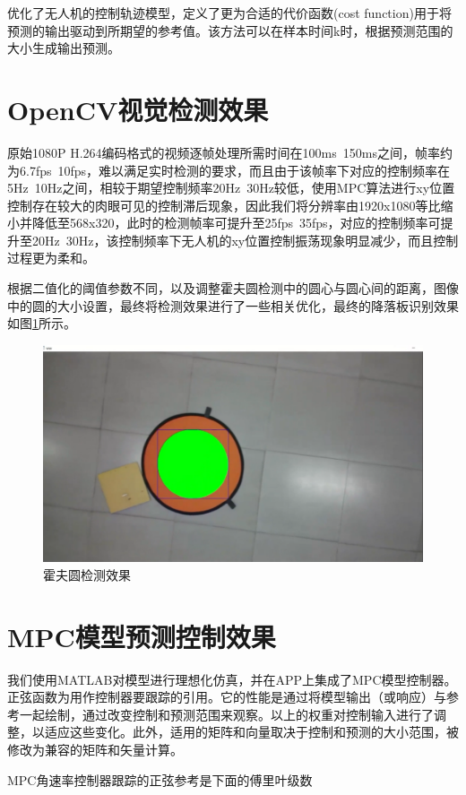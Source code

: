 优化了无人机的控制轨迹模型，定义了更为合适的代价函数(cost function)用于将预测的输出驱动到所期望的参考值。该方法可以在样本时间k时，根据预测范围的大小生成输出预测。

\section{OpenCV视觉检测效果}

原始1080P H.264编码格式的视频逐帧处理所需时间在100ms~150ms之间，帧率约为6.7fps~10fps，难以满足实时检测的要求，而且由于该帧率下对应的控制频率在5Hz~10Hz之间，相较于期望控制频率20Hz~30Hz较低，使用MPC算法进行xy位置控制存在较大的肉眼可见的控制滞后现象，因此我们将分辨率由1920x1080等比缩小并降低至568x320，此时的检测帧率可提升至25fps~35fps，对应的控制频率可提升至20Hz~30Hz，该控制频率下无人机的xy位置控制振荡现象明显减少，而且控制过程更为柔和。

根据二值化的阈值参数不同，以及调整霍夫圆检测中的圆心与圆心间的距离，图像中的圆的大小设置，最终将检测效果进行了一些相关优化，最终的降落板识别效果如图\ref{Fig:img16}所示。

\begin{figure}[ht]
  \centering
  \includegraphics[width=0.8\linewidth]{./Figure/Hough_Circle_Detection.png}
  \caption{霍夫圆检测效果}\label{Fig:img16}
\end{figure}

\section{MPC模型预测控制效果}

我们使用MATLAB对模型进行理想化仿真，并在APP上集成了MPC模型控制器。正弦函数为用作控制器要跟踪的引用。它的性能是通过将模型输出（或响应）与参考一起绘制，通过改变控制和预测范围来观察。以上的权重对控制输入进行了调整，以适应这些变化。此外，适用的矩阵和向量取决于控制和预测的大小范围，被修改为兼容的矩阵和矢量计算。

MPC角速率控制器跟踪的正弦参考是下面的傅里叶级数

